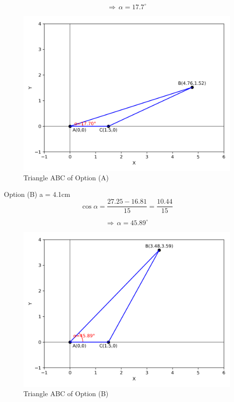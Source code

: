 \documentclass[journal]{IEEEtran}
\begin{document}
 \begin{equation}
\Rightarrow \, \alpha = 17.7^\circ     
 \end{equation}

\begin{figure}[htbp]
    \centering
    \includegraphics[width=\columnwidth]{figs/fig1.png}
    \caption{Triangle ABC of Option (A)}
    \label{fig:placeholder}
\end{figure}

\newpage

Option (B) a = 4.1cm
\begin{equation}
    \cos\alpha = \dfrac{27.25 - 16.81}{15} = \dfrac{10.44}{15}
\end{equation}

 \begin{equation}
\Rightarrow \, \alpha = 45.89^\circ     
 \end{equation}

\begin{figure}[htbp]
    \centering
    \includegraphics[width=\columnwidth]{figs/fig2.png}
    \caption{Triangle ABC of Option (B)}
    \label{fig:placeholder}
\end{figure}
\end{document}
